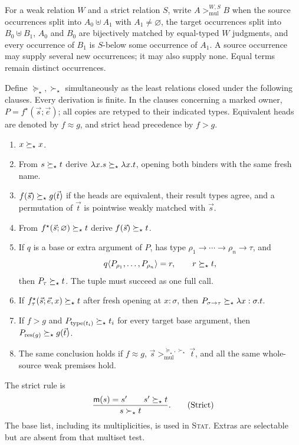 \begin{definition}\label{def:multiset}
For a weak relation $W$ and a strict relation $S$, write
$A>_{\mathrm{mul}}^{W,S}B$ when the source occurrences split into
$A_0\uplus A_1$ with $A_1\ne\varnothing$, the target occurrences split
into $B_0\uplus B_1$, $A_0$ and $B_0$ are bijectively matched by
equal-typed $W$ judgments, and every occurrence of $B_1$ is $S$-below
some occurrence of $A_1$. A source occurrence may supply several new
occurrences; it may also supply none. Equal terms remain distinct
occurrences.
\end{definition}

Define $\succeq_\star,\succ_\star$ simultaneously as the least relations
closed under the following clauses. Every derivation is finite. In the
clauses concerning a marked owner, $P=f^\star(\vec s;\vec e)$; all copies
are retyped to their indicated types. Equivalent heads are denoted by
$f\approx g$, and strict head precedence by $f>g$.
\begin{enumerate}[label=\textsc{\arabic*.}]
\item[\textsc{Var}] $x\succeq_\star x$.
\item[\textsc{Abs}] From $s\succeq_\star t$ derive
$\lambda x.s\succeq_\star \lambda x.t$, opening both binders with the same fresh name.
\item[\textsc{Fun}] $f(\vec s)\succeq_\star g(\vec t)$ if the heads are equivalent,
their result types agree, and a permutation of $\vec t$ is pointwise
weakly matched with $\vec s$.
\item[\textsc{Put}] From $f^\star(\vec s;\varnothing)\succeq_\star t$ derive
$f(\vec s)\succeq_\star t$.
\item[\textsc{Select}] If $q$ is a base or extra argument of $P$, has type
$\rho_1\to\cdots\to\rho_n\to\tau$, and
\[
 q\langle P_{\rho_1},\ldots,P_{\rho_n}\rangle=r,\qquad r\succeq_\star t,
\]
then $P_\tau\succeq_\star t$. The tuple must succeed as one full call.
\item[\textsc{FAbs}] If
$f^\star_\tau(\vec s;\vec e,x)\succeq_\star t$ after fresh opening at
$x:\sigma$, then
$P_{\sigma\to\tau}\succeq_\star \lambda x:\sigma.t$.
\item[\textsc{Copy}] If $f>g$ and $P_{\operatorname{type}(t_i)}\succeq_\star t_i$
for every target base argument, then $P_{\operatorname{res}(g)}\succeq_\star g(\vec t)$.
\item[\textsc{Stat}] The same conclusion holds if $f\approx g$,
$\vec s>_{\mathrm{mul}}^{\succeq_\star,\succ_\star}\vec t$, and
all the same whole-source weak premises hold.
\end{enumerate}
The strict rule is
\[
 \frac{\mathsf m(s)=s'\qquad s'\succeq_\star t}{s\succ_\star t}.
 \tag{Strict}
\]
The base list, including its multiplicities, is used in \textsc{Stat}.
Extras are selectable but are absent from that multiset test.

